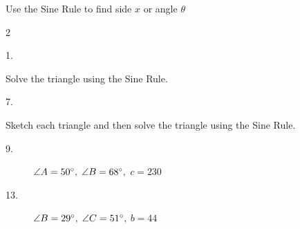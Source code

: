 Use the Sine Rule to find side $x$ or angle $\theta $  
\columnsep =30pt
\begin {multicols}{2}
 


\end {multicols}



\begin{description}
\item [1.]   
\columnsep =30pt
 \end{description}

Solve the triangle using the Sine Rule. 


\begin{description}
\item [7.]    
\setlength\fboxrule{0in}\setlength\fboxsep{0.2in}
\end{description}

Sketch each triangle and then solve the triangle using the Sine Rule. 


\begin{description}
\item [9.] $\angle A =50 \mbox{{\ensuremath{{}^\circ}}}\text{,}$ $\angle B =68 \mbox{{\ensuremath{{}^\circ}}}\text{,}$ $c =230$ 

\item [13.] $\angle B =29 \mbox{{\ensuremath{{}^\circ}}}\text{,}$ $\angle C =51 \mbox{{\ensuremath{{}^\circ}}}\text{,}$ $b =44$ \end{description}

